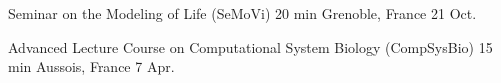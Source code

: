 
\begin{cvhonors}

  \cvhonor
    {Seminar on the Modeling of Life (SeMoVi)} %
    {20 min} %
    {Grenoble, France} %
    {21 Oct.} %
    {} %

  \cvhonor
    {Advanced Lecture Course on Computational System Biology (CompSysBio)} %
    {15 min} %
    {Aussois, France} %
    {7 Apr.} %
    {} %
    
\end{cvhonors}